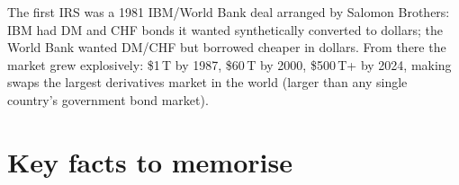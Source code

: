 \begin{historybox}
The first IRS was a 1981 IBM/World Bank deal arranged by Salomon
Brothers: IBM had DM and CHF bonds it wanted synthetically converted
to dollars; the World Bank wanted DM/CHF but borrowed cheaper in
dollars.  From there the market grew explosively: \$1\,T by 1987,
\$60\,T by 2000, \$500\,T+ by 2024, making swaps the largest
derivatives market in the world (larger than any single country's
government bond market).
\end{historybox}


\section*{Key facts to memorise}
\label{sec:fi_key_facts}

